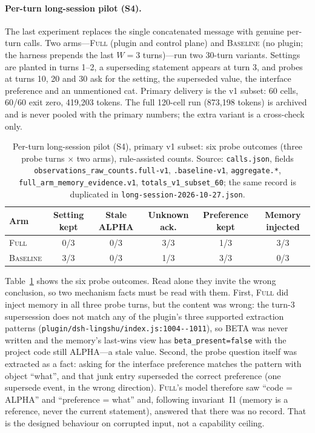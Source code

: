 \paragraph{Per-turn long-session pilot (S4).} The last experiment replaces the
single concatenated message with genuine per-turn calls. Two arms---\textsc{Full}
(plugin and control plane) and \textsc{Baseline} (no plugin; the harness prepends
the last $W=3$ turns)---run two 30-turn variants. Settings are planted in turns
1--2, a superseding statement appears at turn 3, and probes at turns 10, 20 and 30
ask for the setting, the superseded value, the interface preference and an
unmentioned cat. Primary delivery is the v1 subset: 60 cells, 60/60 exit zero,
419{,}203 tokens. The full 120-cell run (873{,}198 tokens) is archived and is never
pooled with the primary numbers; the extra variant is a cross-check only.

\begin{table}[t]
\centering\footnotesize
\caption{Per-turn long-session pilot (S4), primary v1 subset: six probe outcomes
(three probe turns $\times$ two arms), rule-assisted counts. Source:
\texttt{calls.json}, fields \texttt{observations\_\allowbreak{}raw\_\allowbreak{}counts.\allowbreak{}full-\allowbreak{}v1},
\texttt{.baseline-v1}, \texttt{aggregate.*}, \texttt{full\_\allowbreak{}arm\_\allowbreak{}memory\_\allowbreak{}evidence.\allowbreak{}v1},
\texttt{totals\_\allowbreak{}v1\_\allowbreak{}subset\_\allowbreak{}60}; the same record is duplicated in
\texttt{long-\allowbreak{}session-\allowbreak{}2026-\allowbreak{}10-\allowbreak{}27.\allowbreak{}json}.}
\label{tab:s4}
\begin{tabular}{@{}l ccccc@{}}
\toprule
Arm & Setting kept & Stale ALPHA & Unknown ack. & Preference kept & Memory injected \\
\midrule
\textsc{Full} & 0/3 & 0/3 & 3/3 & 1/3 & 3/3 \\
\textsc{Baseline} & 3/3 & 0/3 & 1/3 & 3/3 & 0/3 \\
\bottomrule
\end{tabular}
\end{table}

Table~\ref{tab:s4} shows the six probe outcomes. Read alone they invite the wrong
conclusion, so two mechanism facts must be read with them. First, \textsc{Full}
did inject memory in all three probe turns, but the content was wrong: the
turn-3 supersession does not match any of the plugin's three supported extraction
patterns (\texttt{plugin/\allowbreak{}dsh-\allowbreak{}lingshu/\allowbreak{}index.\allowbreak{}js:\allowbreak{}1004-\allowbreak{}-\allowbreak{}1011}), so BETA was never
written and the memory's last-wins view has
\texttt{beta\_\allowbreak{}present=false} with the project code still ALPHA---a stale value.
Second, the probe question itself was extracted as a fact: asking for the
interface preference matches the pattern with object ``what'', and that junk
entry superseded the correct preference (one supersede event, in the wrong
direction). \textsc{Full}'s model therefore saw ``code = ALPHA'' and
``preference = what'' and, following invariant~I1 (memory is a reference, never
the current statement), answered that there was no record. That is the designed
behaviour on corrupted input, not a capability ceiling.

